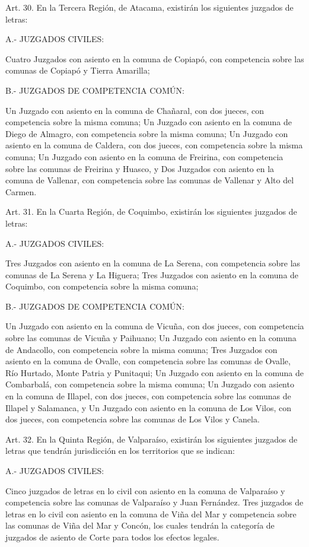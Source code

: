     Art. 30. En la Tercera Región, de Atacama, existirán los siguientes juzgados de letras:

    A.- JUZGADOS CIVILES:

    Cuatro Juzgados con asiento en la comuna de Copiapó, con competencia sobre las comunas de Copiapó y Tierra Amarilla;

    B.- JUZGADOS DE COMPETENCIA COMÚN:

    Un Juzgado con asiento en la comuna de Chañaral, con dos jueces, con competencia sobre la misma comuna;
    Un Juzgado con asiento en la comuna de Diego de Almagro, con competencia sobre la misma comuna;
    Un Juzgado con asiento en la comuna de Caldera, con dos jueces, con competencia sobre la misma comuna;
    Un Juzgado con asiento en la comuna de Freirina, con competencia sobre las comunas de Freirina y Huasco, y
    Dos Juzgados con asiento en la comuna de Vallenar, con competencia sobre las comunas de Vallenar y Alto del Carmen.


    Art. 31. En la Cuarta Región, de Coquimbo, existirán los siguientes juzgados de letras:

    A.- JUZGADOS CIVILES:

    Tres Juzgados con asiento en la comuna de La Serena, con competencia sobre las comunas de La Serena y La Higuera;
    Tres Juzgados con asiento en la comuna de Coquimbo, con competencia sobre la misma comuna;

    B.- JUZGADOS DE COMPETENCIA COMÚN:

    Un Juzgado con asiento en la comuna de Vicuña, con dos jueces, con competencia sobre las comunas de Vicuña y Paihuano;
    Un Juzgado con asiento en la comuna de Andacollo, con competencia sobre la misma comuna;
    Tres Juzgados con asiento en la comuna de Ovalle, con competencia sobre las comunas de Ovalle, Río Hurtado, Monte Patria y Punitaqui;
    Un Juzgado con asiento en la comuna de Combarbalá, con competencia sobre la misma comuna;
    Un Juzgado con asiento en la comuna de Illapel, con dos jueces, con competencia sobre las comunas de Illapel y Salamanca, y
    Un Juzgado con asiento en la comuna de Los Vilos, con dos jueces, con competencia sobre las comunas de Los Vilos y Canela.


    Art. 32. En la Quinta Región, de Valparaíso, existirán los siguientes juzgados de letras que tendrán jurisdicción en los territorios que se indican:

    A.- JUZGADOS CIVILES:

    Cinco juzgados de letras en lo civil con asiento en la comuna de Valparaíso y competencia sobre las comunas de Valparaíso y Juan Fernández.
    Tres juzgados de letras en lo civil con asiento en la comuna de Viña del Mar y competencia sobre las comunas de Viña del Mar y Concón, los cuales tendrán la categoría de juzgados de asiento de Corte para todos los efectos legales.

